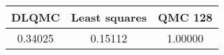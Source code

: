 \begin{tabular}{|c|c|c|}
\hline
DLQMC&Least squares&QMC 128\\ 
\hline

0.34025 & 0.15112 & 1.00000\\ 
\hline
\end{tabular}

